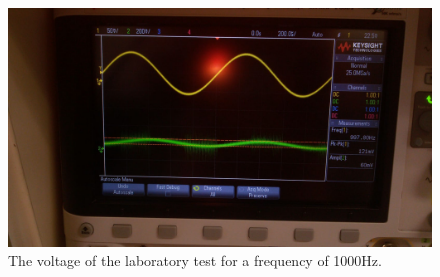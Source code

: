 \begin{figure}[H] 
\centering
\includegraphics[width=0.6\linewidth]{1000Hz.jpeg}
\caption{The voltage of the laboratory test for a frequency of 1000Hz.}
\label{Fig11: 1000Hz}
\end{figure}
